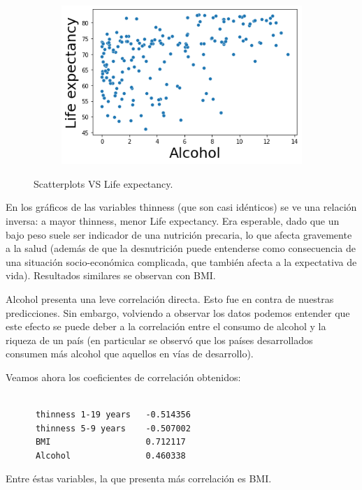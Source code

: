 \begin{itemize}
\begin{figure}[H]
\begin{subfigure}{0.2\linewidth}
              \end{subfigure}
                \hfill
                \begin{subfigure}{0.2\linewidth}
                \centering
                \includegraphics[width=\textwidth]{img/33.png}
              \end{subfigure}
               \caption{Scatterplots VS Life expectancy.}
               
               \label{fig: 18}
        \end{figure}    
    
    En los gráficos de las variables thinness (que son casi idénticos) se ve una relación inversa: a mayor thinness, menor Life expectancy. 
    Era esperable, dado que un bajo peso suele ser indicador de una nutrición precaria, lo que afecta gravemente a la salud (además de que la desnutrición puede entenderse como consecuencia de una situación socio-económica complicada, que también afecta a la expectativa de vida). 
    Resultados similares se observan con BMI.

    
    Alcohol presenta una leve correlación directa. Esto fue en contra de nuestras predicciones. Sin embargo, volviendo a observar los datos podemos entender que este efecto se puede deber a la correlación entre el consumo de alcohol y la riqueza de un país (en particular se observó que los países desarrollados consumen más alcohol que aquellos en vías de desarrollo).
    
    
    Veamos ahora los coeficientes de correlación obtenidos:
    
    \begin{verbatim}
   		
      thinness 1-19 years   -0.514356
      thinness 5-9 years    -0.507002
      BMI                   0.712117
      Alcohol               0.460338
    \end{verbatim}
    
    Entre éstas variables, la que presenta más correlación es BMI. 
\end{itemize}

